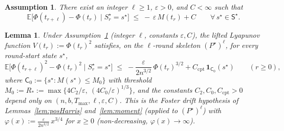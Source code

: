 \documentclass[11pt]{article}
\newtheorem{lem}{Lemma}
\newtheorem{asm}{Assumption}
\theoremstyle{definition}
\begin{document}
\begin{asm}
\label{asm:Foster}
There exist an integer $\ell \geq 1$, $\varepsilon > 0$, and $C < \infty$ such that
\begin{equation*}
  \mathbb{E}\bigl[\Phi(t_{r+\ell}) - \Phi(t_r) \mid S^{\star}_r = s^{\star}\bigr] \;\leq\; -\,\varepsilon\,M(t_r) + C \qquad \forall\, s^{\star} \in \mathsf{S}^{\star}.
\end{equation*}
\end{asm}

\begin{lem}
\label{lem:phi2-foster-drift}
Under Assumption~\ref{asm:Foster} (integer $\ell$, constants $\varepsilon, C$), the lifted Lyapunov function $V(t_r) := \Phi(t_r)^2$ satisfies, on the $\ell$-round skeleton $(P^{\star})^{\ell}$, for every round-start state $s^{\star}$,
\[
  \mathbb{E}\bigl[\Phi(t_{r+\ell})^2 - \Phi(t_r)^2 \mid S^{\star}_r = s^{\star}\bigr] \;\leq\; -\frac{\varepsilon}{2n^{3/2}}\,\Phi(t_r)^{3/2} + C_{\mathrm{cpt}}\,\mathbf{1}_{\mathsf{C}_0}(s^{\star})
  \qquad (r \geq 0),
\]
where $\mathsf{C}_0 := \{s^{\star} : M(s^{\star}) \leq M_0\}$ with threshold $M_0 := R_* := \max\bigl\{4C_2/\varepsilon,\ (4C_0/\varepsilon)^{1/3}\bigr\}$, and the constants $C_2, C_0, C_{\mathrm{cpt}} > 0$ depend only on $(n, b, T_{\max}, \ell, \varepsilon, C)$. This is the Foster drift hypothesis of Lemmas~\ref{lem:posHarris} and~\ref{lem:moment} (applied to $(P^{\star})^{\ell}$) with $\varphi(x) := \tfrac{\varepsilon}{2n^{3/2}}\,x^{3/4}$ for $x \geq 0$ (non-decreasing, $\varphi(x) \to \infty$).
\end{lem}
\end{document}

